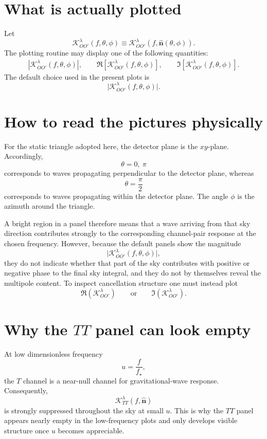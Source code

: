 \documentclass[11pt]{article}
\begin{document}
\section{What is actually plotted}

Let
\begin{equation}
\mathcal K^\lambda_{OO'}(f,\theta,\phi)
\equiv
\mathcal K^\lambda_{OO'}\!\left(f,\hat{\bm n}(\theta,\phi)\right).
\end{equation}
The plotting routine may display one of the following quantities:
\begin{align}
|\mathcal K^\lambda_{OO'}(f,\theta,\phi)|,
\qquad
\Re\!\left[\mathcal K^\lambda_{OO'}(f,\theta,\phi)\right],
\qquad
\Im\!\left[\mathcal K^\lambda_{OO'}(f,\theta,\phi)\right].
\end{align}
The default choice used in the present plots is
\[
\big|\mathcal K^\lambda_{OO'}(f,\theta,\phi)\big|.
\]

\section{How to read the pictures physically}

For the static triangle adopted here, the detector plane is the $xy$-plane.
Accordingly,
\[
\theta = 0,\ \pi
\]
corresponds to waves propagating perpendicular to the detector plane, whereas
\[
\theta = \frac{\pi}{2}
\]
corresponds to waves propagating within the detector plane.
The angle $\phi$ is the azimuth around the triangle.

A bright region in a panel therefore means that a wave arriving from that sky direction contributes strongly to the corresponding channel-pair response at the chosen frequency.
However, because the default panels show the magnitude
\[
\big|\mathcal K^\lambda_{OO'}(f,\theta,\phi)\big|,
\]
they do not indicate whether that part of the sky contributes with positive or negative phase to the final sky integral, and they do not by themselves reveal the multipole content.
To inspect cancellation structure one must instead plot
\[
\Re(\mathcal K^\lambda_{OO'})
\qquad\text{or}\qquad
\Im(\mathcal K^\lambda_{OO'}).
\]

\section{Why the $TT$ panel can look empty}

At low dimensionless frequency
\[
u = \frac{f}{f_\star},
\]
the $T$ channel is a near-null channel for gravitational-wave response.
Consequently,
\[
\mathcal K^\lambda_{TT}(f,\hat{\bm n})
\]
is strongly suppressed throughout the sky at small $u$.
This is why the $TT$ panel appears nearly empty in the low-frequency plots and only develops visible structure once $u$ becomes appreciable.
\end{document}
